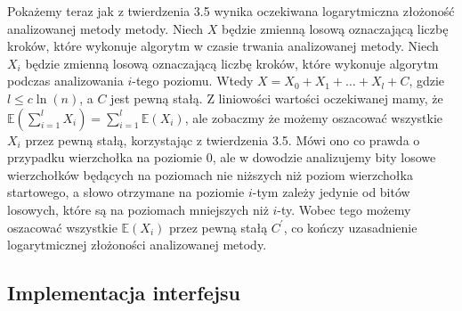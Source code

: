 \documentclass[declaration,shortabstract]{iithesis}
\theoremstyle{definition} \newtheorem{definition}{Definicja}[chapter]
\theoremstyle{plain} \newtheorem{remark}[definition]{Obserwacja}
\theoremstyle{plain} \newtheorem{theorem}[definition]{Twierdzenie}
\theoremstyle{plain} \newtheorem{example}{Przykład}[definition]
\theoremstyle{plain} \newtheorem{lemma}[definition]{Lemat}
\begin{document}
Pokażemy teraz jak z twierdzenia 3.5 wynika oczekiwana logarytmiczna złożoność analizowanej metody metody. Niech $X$ będzie zmienną losową oznaczającą liczbę kroków, które wykonuje algorytm w czasie trwania analizowanej metody. Niech $X_i$ będzie zmienną losową oznaczającą liczbę kroków, które wykonuje algorytm podczas analizowania $i$-tego poziomu. Wtedy $X = X_0 + X_1 + \ldots + X_l + C$, gdzie $l \leq c \ln(n)$, a $C$ jest pewną stałą. Z liniowości wartości oczekiwanej mamy, że $\mathbb{E}(\sum_{i=1}^l X_i) = \sum_{i=1}^l \mathbb{E}(X_i)$, ale zobaczmy że możemy oszacować wszystkie $X_i$ przez pewną stałą, korzystając z twierdzenia 3.5. Mówi ono co prawda o przypadku wierzchołka na poziomie $0$, ale w dowodzie analizujemy bity losowe wierzchołków będących na poziomach nie niższych niż poziom wierzchołka startowego, a słowo otrzymane na poziomie $i$-tym zależy jedynie od bitów losowych, które są na poziomach mniejszych niż $i$-ty. Wobec tego możemy oszacować wszystkie $\mathbb{E}(X_i)$ przez pewną stałą $C^\prime$, co kończy uzasadnienie logarytmicznej złożoności analizowanej metody. 

\subsection{Implementacja interfejsu}
\end{document}
